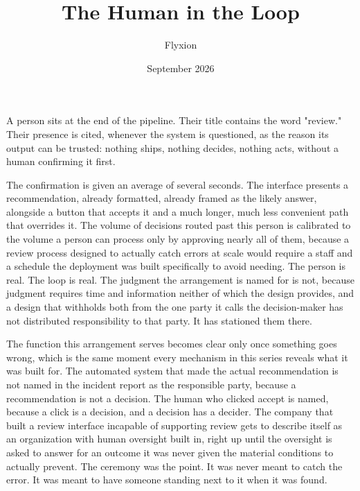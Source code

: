 \documentclass[11pt]{article}
\title{The Human in the Loop}
\author{Flyxion}
\date{September 2026}
\begin{document}
\maketitle

A person sits at the end of the pipeline. Their title contains the word "review." Their presence is cited, whenever the system is questioned, as the reason its output can be trusted: nothing ships, nothing decides, nothing acts, without a human confirming it first.

The confirmation is given an average of several seconds. The interface presents a recommendation, already formatted, already framed as the likely answer, alongside a button that accepts it and a much longer, much less convenient path that overrides it. The volume of decisions routed past this person is calibrated to the volume a person can process only by approving nearly all of them, because a review process designed to actually catch errors at scale would require a staff and a schedule the deployment was built specifically to avoid needing. The person is real. The loop is real. The judgment the arrangement is named for is not, because judgment requires time and information neither of which the design provides, and a design that withholds both from the one party it calls the decision-maker has not distributed responsibility to that party. It has stationed them there.

The function this arrangement serves becomes clear only once something goes wrong, which is the same moment every mechanism in this series reveals what it was built for. The automated system that made the actual recommendation is not named in the incident report as the responsible party, because a recommendation is not a decision. The human who clicked accept is named, because a click is a decision, and a decision has a decider. The company that built a review interface incapable of supporting review gets to describe itself as an organization with human oversight built in, right up until the oversight is asked to answer for an outcome it was never given the material conditions to actually prevent. The ceremony was the point. It was never meant to catch the error. It was meant to have someone standing next to it when it was found.
\end{document}
